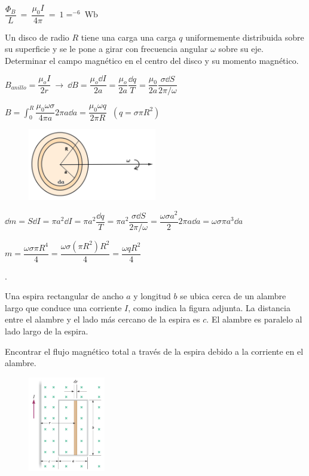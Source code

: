 $\dfrac{\Phi_B}{L} \ = \  \dfrac{\mu_0 I}{4\pi} \ = \ 1=^{-6} \ \mathrm{Wb}$

\begin{prob}
Un disco de radio $R$	tiene una carga una carga $q$ uniformemente distribuida sobre su superficie y se le pone a girar con frecuencia angular $\omega$ sobre su eje. Determinar el campo magnético en el centro del disco y su momento magnético.
\end{prob}

\begin{multicols}{2}
	$B_{anillo}=\dfrac{\mu_o I}{2 r} \ \to \ \dd B=\dfrac{\mu_o \dd I}{2 a}=\dfrac{\mu_o}{2a} \dfrac {\dd q}{T}=\dfrac{\mu_0}{2a} \dfrac{\sigma \dd S}{2\pi / \omega}$
	
	$\displaystyle B= \int_0^R \dfrac{\mu_0 \omega \sigma}{4 \pi a} 2 \pi a \dd a = \dfrac{\mu_0 \omega q}{2\pi R}\ $ \textcolor{gris}{$(q=\sigma \pi R^2)$}
	\begin{figure}[H]
	\centering
	\includegraphics[width=0.5\textwidth]{imagenes/imagenes27/T27IM14.png}
\end{figure}
\end{multicols}

$\dd m=S\dd I=\pi a^2 \dd I=\pi a^2 \dfrac{\dd q}{T}=\pi a^2 \dfrac{\sigma \dd S}{2\pi /\omega}=\dfrac{\omega \sigma a^2}{2}2\pi a \dd a=\omega \sigma \pi a^3 \dd a$

$m=\dfrac{\omega \sigma \pi R^4}{4}=\dfrac{\omega \sigma (\pi R^2) R^2}{4}=\dfrac{\omega q R^2}{4}$

\begin{prob}.

\begin{multicols}{2}
Una espira rectangular de ancho $a$ y longitud $b$ se ubica cerca de un alambre largo que conduce una corriente $I$, como indica la figura adjunta. La distancia entre el alambre y el lado más cercano de la espira es $c$. El alambre es paralelo al lado largo de la espira. 

Encontrar el flujo magnético total a través de la espira debido a la corriente en el alambre.	
\begin{figure}[H]
	\centering
	\includegraphics[width=0.3\textwidth]{imagenes/imagenes27/T27IM15.png}
\end{figure}
\end{multicols}
\end{prob}

